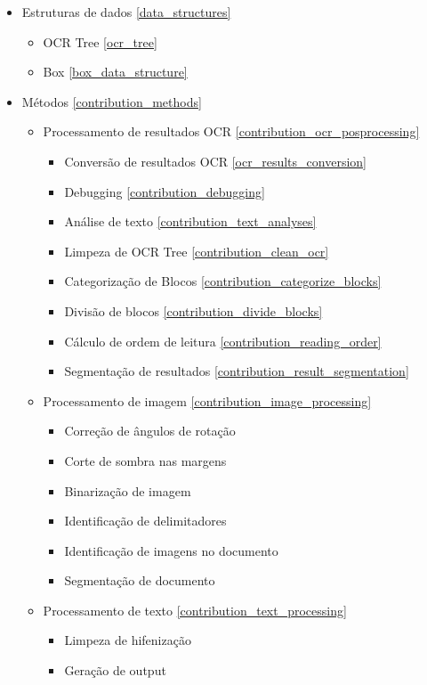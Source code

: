 \begin{itemize}\setlength\itemsep{-0.3em}
	\item Estruturas de dados \ref{data_structures}
	\begin{itemize}\setlength\itemsep{-0.3em}
		\item OCR Tree \ref{ocr_tree}
		\item Box \ref{box_data_structure}
	\end{itemize}
	\item Métodos \ref{contribution_methods}
	
	\begin{itemize}\setlength\itemsep{-0.3em}
		\item Processamento de resultados OCR \ref{contribution_ocr_posprocessing}
		
		\begin{itemize}\setlength\itemsep{-0.3em}
			\item Conversão de resultados OCR \ref{ocr_results_conversion}
			\item Debugging \ref{contribution_debugging}
			\item Análise de texto \ref{contribution_text_analyses}
			\item Limpeza de OCR Tree \ref{contribution_clean_ocr}
			\item Categorização de Blocos \ref{contribution_categorize_blocks}
			\item Divisão de blocos \ref{contribution_divide_blocks}
			\item Cálculo de ordem de leitura \ref{contribution_reading_order}
			\item Segmentação de resultados \ref{contribution_result_segmentation}
		\end{itemize}
		
		\item Processamento de imagem \ref{contribution_image_processing}
		\begin{itemize}\setlength\itemsep{-0.3em}
			\item Correção de ângulos de rotação
			\item Corte de sombra nas margens
			\item Binarização de imagem
			\item Identificação de delimitadores
			\item Identificação de imagens no documento
			\item Segmentação de documento
		\end{itemize}
		
		\item Processamento de texto \ref{contribution_text_processing}
		\begin{itemize}\setlength\itemsep{-0.3em}
			\item Limpeza de hifenização
			\item Geração de output
		\end{itemize}
		
		
	\end{itemize}
\end{itemize}


